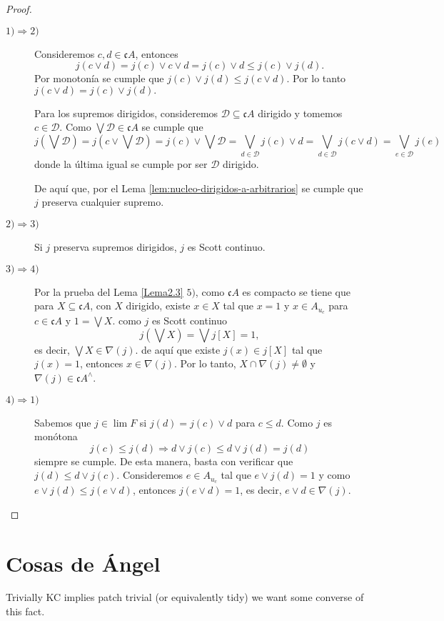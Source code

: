 \documentclass[11pt]{amsart}
\theoremstyle{plain}
\theoremstyle{definition}
\begin{document}
\begin{proof}
    \begin{description}
        \item[$1)\Rightarrow 2)$] Consideremos $c, d\in \mathfrak{c}A$, entonces
        \[
        j(c\vee d)=j(c)\vee c\vee d=j(c)\vee d\leq j(c)\vee j(d).
        \]
        Por monotonía se cumple que $j(c)\vee j(d)\leq j(c\vee d)$. Por lo tanto $j(c\vee d)=j(c)\vee j(d).$

        Para los supremos dirigidos, consideremos $\mathcal{D}\subseteq \mathfrak{c}A$ dirigido y tomemos $c\in \mathcal{D}$. Como $\bigvee \mathcal{D}\in \mathfrak{c}A$ se cumple que 
        \[
        j(\bigvee \mathcal{D})=j(c\vee \bigvee \mathcal{D})=j(c)\vee\bigvee \mathcal{D}=\bigvee_{d\in \mathcal{D}}j(c)\vee d=\bigvee_{d\in \mathcal{D}}j(c\vee d)=\bigvee_{e\in \mathcal{D}}j(e)
        \]
        donde la última igual se cumple por ser $\mathcal{D}$ dirigido. 

        De aquí que, por el Lema \ref{lem:nucleo-dirigidos-a-arbitrarios} se cumple que $j$ preserva cualquier supremo.

        \item[$2)\Rightarrow 3)$] Si $j$ preserva supremos dirigidos, $j$ es Scott continuo.

        \item[$3)\Rightarrow 4)$] Por la prueba del Lema \ref{Lema2.3} $5)$, como $\mathfrak{c}A$ es compacto se tiene que para $X\subseteq \mathfrak{c}A$, con $X$ dirigido, existe $x\in X$ tal que $x=1$ y $x\in A_{u_c}$ para $c\in \mathfrak{c}A$ y $1=\bigvee X$. como $j$ es Scott continuo
        \[
        j(\bigvee X)=\bigvee j[X]=1,
        \]
        es decir, $\bigvee X\in \nabla(j)$. de aquí que existe $j(x)\in j[X]$ tal que $j(x)=1$, entonces $x\in \nabla(j)$. Por lo tanto, $X\cap\nabla(j)\neq\emptyset$ y $\nabla(j)\in \mathfrak{c}A^\wedge$.

        \item[$4)\Rightarrow 1)$] Sabemos que $j\in \lim F$ si $j(d)=j(c)\vee d$ para $c\leq d$. Como $j$ es monótona
        \[
        j(c)\leq j(d)\Rightarrow d\vee j(c)\leq d\vee j(d)=j(d)
        \]
        siempre se cumple. De esta manera, basta con verificar que $j(d)\leq d\vee j(c)$. Consideremos $e\in A_{u_c}$ tal que $e\vee j(d)=1$ y como $e\vee j(d)\leq j(e\vee d)$, entonces $j(e\vee d)=1$, es decir, $e\vee d\in \nabla(j)$.
    \end{description}
\end{proof}

\section{Cosas de Ángel}
Trivially {\rm KC} implies patch trivial (or equivalently tidy) we want some converse of this fact.
\end{document}
